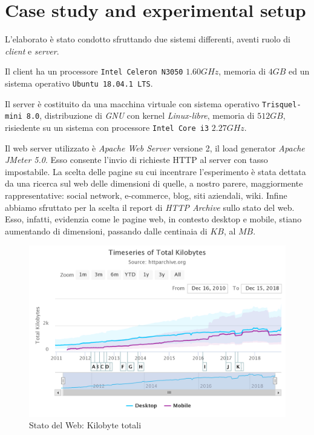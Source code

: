 \chapter{Case study and experimental setup}
	L'elaborato è stato condotto sfruttando due sistemi differenti, aventi ruolo di \emph{client} e \emph{server}.\par
	Il client ha un processore \texttt{Intel Celeron N3050} $1.60GHz$,  memoria di $4GB$ ed un sistema operativo \texttt{Ubuntu 18.04.1 LTS}.\par
	Il server è costituito da una macchina virtuale con sistema operativo \texttt{Trisquel-mini 8.0}, distribuzione di \emph{GNU} con kernel \emph{Linux-libre}, memoria di $512GB$, risiedente su un sistema con processore \texttt{Intel Core i3} $2.27GHz$.\par
	Il web server utilizzato è \emph{Apache Web Server} versione 2, il load generator \emph{Apache JMeter 5.0}. Esso consente l'invio di richieste HTTP al server con tasso impostabile. La scelta delle pagine su cui incentrare l'esperimento è stata dettata da una ricerca sul web delle dimensioni di quelle, a nostro parere, maggiormente rappresentative: social network, e-commerce, blog, siti aziendali, wiki. Infine abbiamo sfruttato per la scelta il report di \emph{HTTP Archive} sullo stato del web. Esso, infatti, evidenzia come le pagine web, in contesto desktop e mobile, stiano aumentando di dimensioni, passando dalle centinaia di $KB$, al $MB$.
	\begin{figure}[H]
		\centering
		\includegraphics[scale=0.3]{./immagine/chart.png}
		\caption{Stato del Web: Kilobyte totali}
		\label{fig:httparc}
	\end{figure}
	
